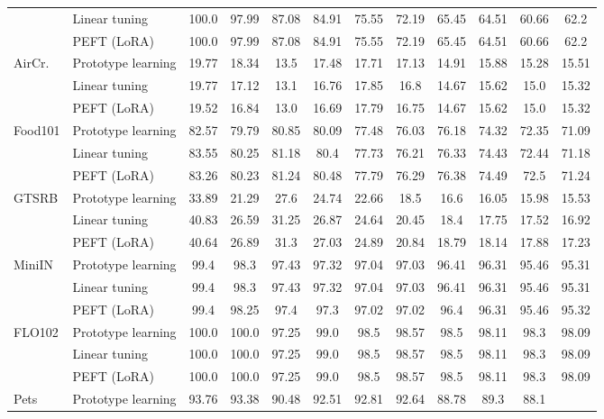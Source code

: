 \begin{tabular}{l l cccccccccc}
 & Linear tuning & 100.0 & 97.99 & 87.08 & 84.91 & 75.55 & 72.19 & 65.45 & 64.51 & 60.66 & 62.2 \\
 & PEFT (LoRA) & 100.0 & 97.99 & 87.08 & 84.91 & 75.55 & 72.19 & 65.45 & 64.51 & 60.66 & 62.2 \\
\midrule
\multirow{3}{*}{AirCr.} & Prototype learning & 19.77 & 18.34 & 13.5 & 17.48 & 17.71 & 17.13 & 14.91 & 15.88 & 15.28 & 15.51 \\
 & Linear tuning & 19.77 & 17.12 & 13.1 & 16.76 & 17.85 & 16.8 & 14.67 & 15.62 & 15.0 & 15.32 \\
 & PEFT (LoRA) & 19.52 & 16.84 & 13.0 & 16.69 & 17.79 & 16.75 & 14.67 & 15.62 & 15.0 & 15.32 \\
\midrule
\multirow{3}{*}{Food101} & Prototype learning & 82.57 & 79.79 & 80.85 & 80.09 & 77.48 & 76.03 & 76.18 & 74.32 & 72.35 & 71.09 \\
 & Linear tuning & 83.55 & 80.25 & 81.18 & 80.4 & 77.73 & 76.21 & 76.33 & 74.43 & 72.44 & 71.18 \\
 & PEFT (LoRA) & 83.26 & 80.23 & 81.24 & 80.48 & 77.79 & 76.29 & 76.38 & 74.49 & 72.5 & 71.24 \\
\midrule
\multirow{3}{*}{GTSRB} & Prototype learning & 33.89 & 21.29 & 27.6 & 24.74 & 22.66 & 18.5 & 16.6 & 16.05 & 15.98 & 15.53 \\
 & Linear tuning & 40.83 & 26.59 & 31.25 & 26.87 & 24.64 & 20.45 & 18.4 & 17.75 & 17.52 & 16.92 \\
 & PEFT (LoRA) & 40.64 & 26.89 & 31.3 & 27.03 & 24.89 & 20.84 & 18.79 & 18.14 & 17.88 & 17.23 \\
\midrule
\multirow{3}{*}{MiniIN} & Prototype learning & 99.4 & 98.3 & 97.43 & 97.32 & 97.04 & 97.03 & 96.41 & 96.31 & 95.46 & 95.31 \\
 & Linear tuning & 99.4 & 98.3 & 97.43 & 97.32 & 97.04 & 97.03 & 96.41 & 96.31 & 95.46 & 95.31 \\
 & PEFT (LoRA) & 99.4 & 98.25 & 97.4 & 97.3 & 97.02 & 97.02 & 96.4 & 96.31 & 95.46 & 95.32 \\
\midrule
\multirow{3}{*}{FLO102} & Prototype learning & 100.0 & 100.0 & 97.25 & 99.0 & 98.5 & 98.57 & 98.5 & 98.11 & 98.3 & 98.09 \\
 & Linear tuning & 100.0 & 100.0 & 97.25 & 99.0 & 98.5 & 98.57 & 98.5 & 98.11 & 98.3 & 98.09 \\
 & PEFT (LoRA) & 100.0 & 100.0 & 97.25 & 99.0 & 98.5 & 98.57 & 98.5 & 98.11 & 98.3 & 98.09 \\
\midrule
\multirow{3}{*}{Pets} & Prototype learning & 93.76 & 93.38 & 90.48 & 92.51 & 92.81 & 92.64 & 88.78 & 89.3 & 88.1 \\

\end{tabular}
